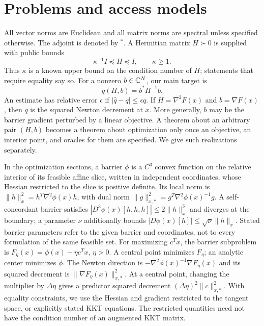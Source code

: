 \section{Problems and access models}\label{sec:models}
All vector norms are Euclidean and all matrix norms are spectral unless
specified otherwise. The adjoint is denoted by $^*$. A Hermitian matrix
$H\succ0$ is supplied with public bounds
\begin{equation}\label{eq:spectral-promise}
                 \kappa^{-1}I\preceq H\preceq I,\qquad \kappa\geq1.
\end{equation}
Thus $\kappa$ is a known upper bound on the condition number of $H$;
statements that require equality say so. For a nonzero $b\in\mathbb C^N$, our
main target is
\begin{equation}\label{eq:target}
                            q(H,b)=b^*H^{-1}b.
\end{equation}
An estimate has relative error $\epsilon$ if
$|\widehat q-q|\leq\epsilon q$. If $H=\nabla^2F(x)$ and
$b=\nabla F(x)$, then $q$ is the squared Newton decrement at $x$. More
generally, $b$ may be the barrier gradient perturbed by a linear
objective. A theorem about an arbitrary pair $(H,b)$ becomes a theorem
about optimization only once an objective, an interior point, and oracles
for them are specified. We give such realizations separately.

In the optimization sections, a barrier $\phi$ is a $C^3$ convex
function on the relative interior of its feasible affine slice, written
in independent coordinates, whose Hessian restricted to the slice is
positive definite.
Its local norm is $\|h\|_x^2=h^T\nabla^2\phi(x)h$, with dual norm
$\|g\|_{x,*}^2=g^T\nabla^2\phi(x)^{-1}g$.
A self-concordant barrier satisfies
$|D^3\phi(x)[h,h,h]|\leq2\|h\|_x^3$ and diverges at the boundary;
a parameter $\nu$ additionally bounds
$|D\phi(x)[h]|\leq\sqrt\nu\|h\|_x$.
Stated barrier parameters refer to the given barrier and coordinates,
not to every formulation of the same feasible set.
For maximizing $c^Tx$, the barrier subproblem is
$F_\eta(x)=\phi(x)-\eta c^Tx$, $\eta>0$.
A central point minimizes $F_\eta$; an analytic center minimizes $\phi$.
The Newton direction is $-\nabla^2\phi(x)^{-1}\nabla F_\eta(x)$ and its
squared decrement is $\|\nabla F_\eta(x)\|_{x,*}^2$.
At a central point, changing the multiplier by $\Delta\eta$ gives a
predictor squared decrement $(\Delta\eta)^2\|c\|_{x,*}^2$.
With equality constraints, we use the Hessian and gradient restricted
to the tangent space, or explicitly stated KKT equations. The restricted
quantities need not have the condition number of an augmented KKT
matrix.

